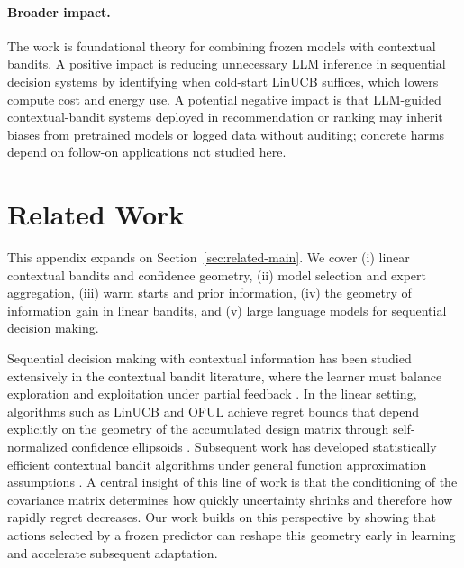 \documentclass{article}
\theoremstyle{definition}
\theoremstyle{remark}
\theoremstyle{remark}
\begin{document}
\paragraph{Broader impact.}
The work is foundational theory for combining frozen models with contextual
bandits. A positive impact is reducing unnecessary LLM inference in
sequential decision systems by identifying when cold-start LinUCB suffices,
which lowers compute cost and energy use. A potential negative impact is that
LLM-guided contextual-bandit systems deployed in recommendation or ranking
may inherit biases from pretrained models or logged data without auditing;
concrete harms depend on follow-on applications not studied here.





\appendix

\section{Related Work}\label{sec:related}
This appendix expands on Section~\ref{sec:related-main}. We cover (i) linear contextual bandits and confidence geometry,
(ii) model selection and expert aggregation, (iii) warm starts and prior
information, (iv) the geometry of information gain in linear bandits, and
(v) large language models for sequential decision making.

Sequential decision making with contextual information has been studied
extensively in the contextual bandit literature, where the learner must
balance exploration and exploitation under partial feedback
\cite{langford2007epoch,agarwal2014taming,foster2021statistical,
lattimore2020bandit}. In the linear setting, algorithms such as LinUCB and
OFUL achieve regret bounds that depend explicitly on the geometry of the
accumulated design matrix through self-normalized confidence ellipsoids
\cite{chu2011contextual,abbasi2011improved}. Subsequent work has developed
statistically efficient contextual bandit algorithms under general function
approximation assumptions \cite{agarwal2012contextual,foster2018practical,
foster2020beyond,simchi2022bypassing,zhu2022contextual,rucker2023infinite,
zhang2024efficient}. A central insight of this line of work is that the
conditioning of the covariance matrix determines how quickly uncertainty
shrinks and therefore how rapidly regret decreases. Our work builds on this
perspective by showing that actions selected by a frozen predictor can
reshape this geometry early in learning and accelerate subsequent adaptation.
\end{document}
